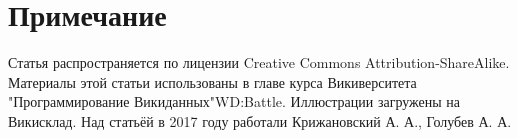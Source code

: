 \section{Примечание}

Статья распространяется по лицензии Creative Commons Attribution-ShareAlike. Материалы этой статьи использованы в главе курса Викиверситета "Программирование Викиданных"{WD:Battle}. Иллюстрации загружены на Викисклад. Над статьёй в 2017 году работали Крижановский А. А., Голубев А. А.